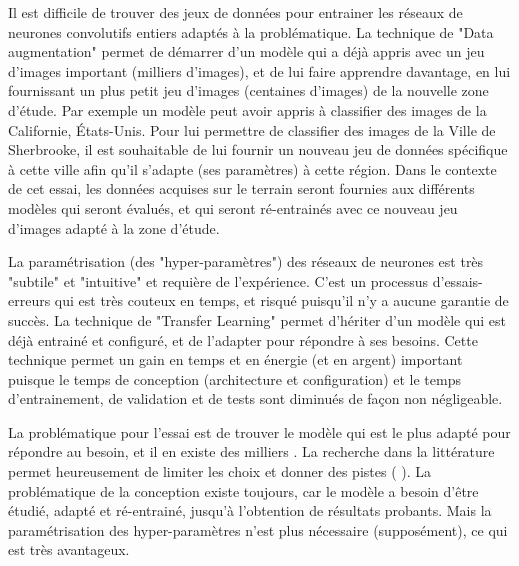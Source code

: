 \par Il est difficile de trouver des jeux de données pour entrainer les réseaux de neurones convolutifs entiers adaptés à la problématique. La technique de "Data augmentation" permet de démarrer d'un modèle qui a déjà appris avec un jeu d'images important (milliers d'images), et de lui faire apprendre davantage, en lui fournissant un plus petit jeu d'images (centaines d'images) de la nouvelle zone d'étude. Par exemple un modèle peut avoir appris à classifier des images de la Californie, États-Unis. Pour lui permettre de classifier des images de la Ville de Sherbrooke, il est souhaitable de lui fournir un nouveau jeu de données spécifique à cette ville afin qu'il s'adapte (ses paramètres) à cette région. Dans le contexte de cet essai, les données acquises sur le terrain seront fournies aux différents modèles qui seront évalués, et qui seront ré-entrainés avec ce nouveau jeu d'images adapté à la zone d'étude.
\par La paramétrisation (des "hyper-paramètres") des réseaux de neurones est très "subtile" et "intuitive" et requière de l'expérience. C'est un processus d'essais-erreurs qui est très couteux en temps, et risqué puisqu'il n'y a aucune garantie de succès. La technique de "Transfer Learning" permet d'hériter d'un modèle qui est déjà entrainé et configuré, et de l'adapter pour répondre à ses besoins. Cette technique permet un gain en temps et en énergie (et en argent) important puisque le temps de conception (architecture et configuration) et le temps d'entrainement, de validation et de tests sont diminués de façon non négligeable.
\begin{comment}
Par exemple le modèle "VGG" prend 2-3 semaines d'entrainement \cite{simonyan_very_2015} avec 4 GPU Titan Black (NVIDIA), coutant 1,200\$US (Amazon.com) chacun (pour un total de 4,800\$US, et cela juste pour les GPUs, qui ne sont qu'un des éléments de l'infrastructure nécessaire). Étant donné que de multiples tentatives sont nécessaires (cycles essai-erreur), la stratégie est d'entrainer plusieurs modèles en parallèle afin d'accélérer le développement, ce qui implique un cout élevé en infrastructure.
\end{comment}
La problématique pour l'essai est de trouver le modèle qui est le plus adapté pour répondre au besoin, et il en existe des milliers \cite{koh_model_2018}. La recherche dans la littérature permet heureusement de limiter les choix et donner des pistes (\cite{jia_real-time_2020} \cite{nguyen_mavnet_2019} \cite{nvidia_jetson_2019-1}). La problématique de la conception existe toujours, car le modèle a besoin d'être étudié, adapté et ré-entrainé, jusqu'à l'obtention de résultats probants. Mais la paramétrisation des hyper-paramètres n'est plus nécessaire (supposément), ce qui est très avantageux.
